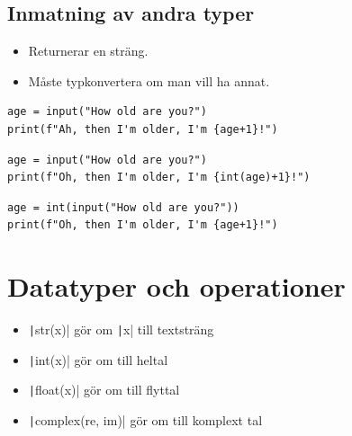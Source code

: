 \subsection{Inmatning av andra typer}

\begin{frame}
  \begin{remark}
    \begin{itemize}
      \item Returnerar en sträng.
      \item Måste typkonvertera om man vill ha annat.
    \end{itemize}
  \end{remark}
\end{frame}

\begin{frame}[fragile]
  \begin{example}
    \begin{verbatim}
age = input("How old are you?")
print(f"Ah, then I'm older, I'm {age+1}!")
    \end{verbatim}
  \end{example}

  \pause

  \begin{example}[Funkar]
    \begin{verbatim}
age = input("How old are you?")
print(f"Oh, then I'm older, I'm {int(age)+1}!")
    \end{verbatim}
  \end{example}

  \begin{example}[Funkar]
    \begin{verbatim}
age = int(input("How old are you?"))
print(f"Oh, then I'm older, I'm {age+1}!")
    \end{verbatim}
  \end{example}
\end{frame}

\section{Datatyper och operationer}

\begin{frame}
  \begin{remark}
    \begin{itemize}
      \item \texttt|str(x)| gör om \texttt|x| till textsträng
      \item \texttt|int(x)| gör om till heltal
      \item \texttt|float(x)| gör om till flyttal
      \item \texttt|complex(re, im)| gör om till komplext tal
    \end{itemize}
  \end{remark}
\end{frame}

